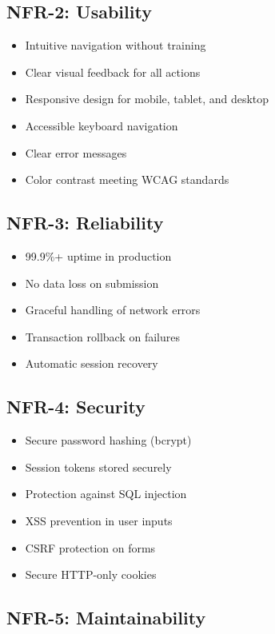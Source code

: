 \documentclass[12pt,a4paper]{report}
\begin{document}
\subsection{NFR-2: Usability}

\begin{itemize}
    \item Intuitive navigation without training
    \item Clear visual feedback for all actions
    \item Responsive design for mobile, tablet, and desktop
    \item Accessible keyboard navigation
    \item Clear error messages
    \item Color contrast meeting WCAG standards
\end{itemize}

\subsection{NFR-3: Reliability}

\begin{itemize}
    \item 99.9\%+ uptime in production
    \item No data loss on submission
    \item Graceful handling of network errors
    \item Transaction rollback on failures
    \item Automatic session recovery
\end{itemize}

\subsection{NFR-4: Security}

\begin{itemize}
    \item Secure password hashing (bcrypt)
    \item Session tokens stored securely
    \item Protection against SQL injection
    \item XSS prevention in user inputs
    \item CSRF protection on forms
    \item Secure HTTP-only cookies
\end{itemize}

\subsection{NFR-5: Maintainability}
\end{document}

